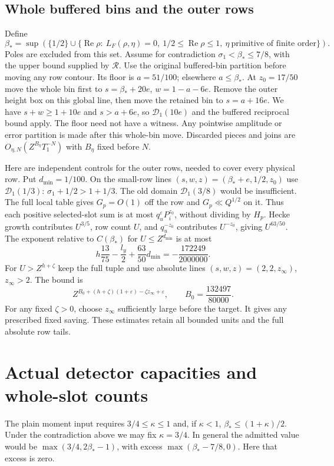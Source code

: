 \documentclass[11pt,a4paper]{article}
\theoremstyle{definition}
\newcommand{\Rea}{\operatorname{Re}}
\newcommand{\eps}{\varepsilon}
\newcommand{\sig}{\sigma_1}
\newcommand{\bet}{\beta_*}
\begin{document}
\subsection{Whole buffered bins and the outer rows}
\label{sec:outer}
Define
\[
 \bet=\sup\left(\{1/2\}\cup
 \{\Rea\rho:\ L_F(\rho,\eta)=0,\ 1/2\le\Rea\rho\le1,\
                   \eta\ \text{primitive of finite order}\}\right).
\]
Poles are excluded from this set. Assume for contradiction
$\sig<\bet\le7/8$, with the upper bound supplied by $\mathcal R$.
Use the original buffered-bin partition before moving
any row contour. Its floor is $a=51/100$; elsewhere $a\le\bet$.
At $z_0=17/50$ move the whole bin first to
$s=\bet+20e$, $w=1-a-6e$. Remove the outer height box on this
global line, then move the retained bin to $s=a+16e$.
We have $s+w\ge1+10e$ and $s>a+6e$, so $\mathcal D_1(10e)$
and the buffered reciprocal bound apply. The floor need not have
a witness. Any pointwise amplitude or error partition is made
after this whole-bin move. Discarded pieces and joins are
$O_{\eta,N}(Z^{B_\eta}T_1^{-N})$ with $B_\eta$ fixed before $N$.

Here are independent controls for the outer rows, needed to cover
every physical row. Put $d_{\min}=1/100$. On the small-row lines
$(s,w,z)=(\bet+e,1/2,z_0)$ use $\mathcal D_1(1/3)$:
$\sig+1/2>1+1/3$. The old domain $\mathcal D_1(3/8)$ would be
insufficient. The full local table gives $G_p=O(1)$ off the row
and $G_p\ll Q^{1/2}$ on it. Thus each positive selected-slot sum
is at most $q_u^\eps P_i^{z_0}$, without dividing by $H_p$.
Hecke growth contributes $U^{3/5}$, row count $U$, and $q_u^{-z_0}$
contributes $U^{-z_0}$, giving $U^{63/50}$.
The exponent relative to $C(\bet)$ for $U\le Z^{d_{\min}}$ is at most
\begin{equation}\label{eq:small}
 h\frac{13}{75}-\frac{l_y}{2}+\frac{63}{50}d_{\min}
 =-\frac{172249}{2000000}.
\end{equation}
For $U>Z^{h+\zeta}$ keep the full tuple and use absolute lines
$(s,w,z)=(2,2,z_\infty)$, $z_\infty>2$. The bound is
\begin{equation}\label{eq:large}
 Z^{B_0+(h+\zeta)(1+\eps)-\zeta z_\infty+\eps},
 \qquad B_0=\frac{132497}{80000}.
\end{equation}
For any fixed $\zeta>0$, choose $z_\infty$ sufficiently large
before the target. It gives any prescribed fixed saving. These
estimates retain all bounded units and the full absolute row tails.

\section{Actual detector capacities and whole-slot counts}
\label{sec:count}
The plain moment input requires $3/4\le\kappa\le1$ and, if
$\kappa<1$, $\bet\le(1+\kappa)/2$. Under the contradiction above
we may fix $\kappa=3/4$. In general the admitted value would be
$\max(3/4,2\bet-1)$, with excess
$\max(\bet-7/8,0)$. Here that excess is zero.
\end{document}
